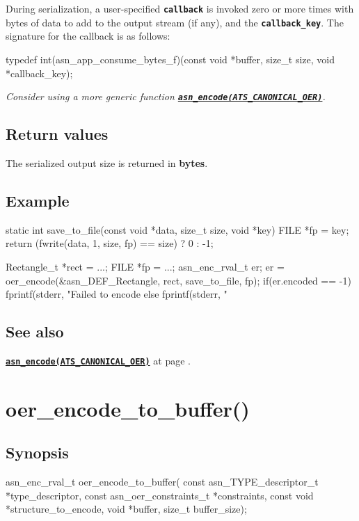 \documentclass[english,oneside,12pt]{book}
\newcommand{\apisection}[2]{\clearpage\section{\label{#1}#2}}
\newcommand{\api}[2]{\hyperref[#1]{\code{#2}}}
\newcommand{\seealso}[2]{\api{#1}{#2} at page \pageref{#1}}
\newcommand{\code}[1]{\texttt{\textbf{\lstinline{#1}}}}
\begin{document}
During serialization, a user-specified \code{callback} is invoked zero
or more times with bytes of data to add to the output stream (if any), and
the \code{callback_key}. The signature for the callback is as follows:

\begin{signature}
typedef int(asn_app_consume_bytes_f)(const void *buffer, size_t size, void *callback_key);
\end{signature}

\noindent\emph{Consider using a more generic function \api{sec:asn_encode}{asn_encode(ATS_CANONICAL_OER)}.}

\subsection*{Return values}


The serialized output size is returned in \textbf{bytes}.

\subsection*{Example}
\begin{example}
static int
save_to_file(const void *data, size_t size, void *key) {
    FILE *fp = key;
    return (fwrite(data, 1, size, fp) == size) ? 0 : -1;
}

Rectangle_t *rect = ...;
FILE *fp = ...;
asn_enc_rval_t er;
er = oer_encode(&asn_DEF_Rectangle, rect, save_to_file, fp);
if(er.encoded == -1) {
   fprintf(stderr, "Failed to encode %
} else {
   fprintf(stderr, "%
}
\end{example}

\subsection*{See also}
\seealso{sec:asn_encode}{asn_encode(ATS_CANONICAL_OER)}.

\apisection{sec:oer_encode_to_buffer}{oer\_encode\_to\_buffer()}

\subsection*{Synopsis}

\begin{signature}
asn_enc_rval_t oer_encode_to_buffer(
    const asn_TYPE_descriptor_t *type_descriptor,
    const asn_oer_constraints_t *constraints,
    const void *structure_to_encode,
    void *buffer, size_t buffer_size);
\end{signature}
\end{document}
